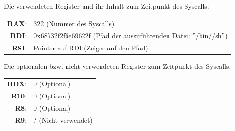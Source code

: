 Die verwendeten Register und ihr Inhalt zum Zeitpunkt des Syscalls:

    \begin{tabular}{rl}
         {\textbf{RAX}:}& {322 (Nummer des Syscalls)}\\
         {\textbf{RDI}:}& {0x68732f2f6e69622f (Pfad der auszuführenden Datei: ''/bin//sh'')}\\
         {\textbf{RSI}:}& {Pointer auf RDI (Zeiger auf den Pfad)}
    \end{tabular}

    
Die optionalen bzw. nicht verwendeten Register zum Zeitpunkt des Syscalls:

    \begin{tabular}{rl}
        {\textbf{RDX}:}& {0 (Optional)}\\
        {\textbf{R10}:}& {0 (Optional)}\\
        {\textbf{R8}:}& {0 (Optional)}\\
        {\textbf{R9}:}& {? (Nicht verwendet)}
    \end{tabular}
    
